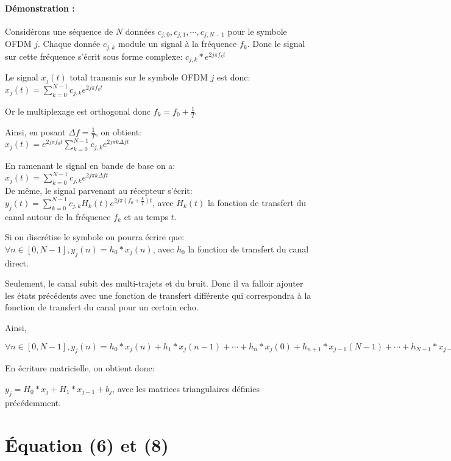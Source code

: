 \paragraph{Démonstration :}

Considérons une séquence de $N$ données $c_{j,0},c_{j,1},\cdots,c_{j,N-1}$ pour le symbole
OFDM $j$. Chaque donnée $c_{j,k}$ module un signal à la fréquence $f_k$. Donc le
signal sur cette fréquence s'écrit sous forme complexe: $c_{j,k}*e^{2j\pi f_kt}$

Le signal $x_j(t)$ total transmis sur le symbole OFDM $j$ est donc: \\
$x_j(t)=\sum_{k=0}^{N-1}c_{j,k}e^{2j\pi f_kt}$

Or le multiplexage est orthogonal donc $f_k=f_0+\frac{1}{T}$

Ainsi, en posant $\Delta f = \frac{1}{T}$, on obtient: \\
$x_j(t)=e^{2j\pi f_0t}\sum_{k=0}^{N-1}c_{j,k}e^{2j\pi k\Delta ft}$

En ramenant le signal en bande de base on a:\\
$x_j(t)=\sum_{k=0}^{N-1}c_{j,k}e^{2j\pi k\Delta ft}$
~\\

De même, le signal parvenant au récepteur s'écrit:\\
$y_j(t)=\sum_{k=0}^{N-1}c_{j,k}H_k(t)e^{2j\pi (f_0+\frac{k}{T})t}$, avec $H_k(t)$ la
fonction de transfert du canal autour de la fréquence $f_k$ et au temps $t$.

Si on discrétise le symbole on pourra écrire que: \\
$\forall n \in [0,N-1], y_j(n) = h_0*x_j(n)$, avec $h_0$ la fonction de
transfert du canal direct.

Seulement, le canal subit des multi-trajets et du bruit. Donc il va falloir
ajouter les états précédents avec une fonction de transfert différente qui
correspondra à la fonction de transfert du canal pour un certain echo.

Ainsi,

$\forall n \in [0,N-1], y_j(n) = h_0*x_j(n) + h_1*x_j(n-1) + \cdots
+h_{n}*x_j(0) + h_{n+1}*x_{j-1}(N-1) + \cdots + h_{N-1}*x_{j-1}(n+1) + b_j$

En écriture matricielle, on obtient donc:

$ y_j = H_0*x_j+H_1*x_{j-1}+b_j$, avec les matrices triangulaires définies précédemment.

\section{Équation (6) et (8)}

